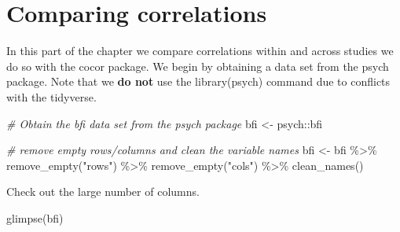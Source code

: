 \documentclass[
]{krantz}
\makeatletter
\newenvironment{Shaded}{\begin{snugshade}}{\end{snugshade}}
\newcommand{\CommentTok}[1]{\textcolor[rgb]{0.37,0.37,0.37}{\textit{#1}}}
\newcommand{\FunctionTok}[1]{\textcolor[rgb]{0,0,0}{#1}}
\newcommand{\NormalTok}[1]{#1}
\newcommand{\OtherTok}[1]{\textcolor[rgb]{0.37,0.37,0.37}{#1}}
\newcommand{\SpecialCharTok}[1]{\textcolor[rgb]{0,0,0}{#1}}
\newcommand{\StringTok}[1]{\textcolor[rgb]{0.5,0.5,0.5}{#1}}
\newenvironment{kframe}{%
\medskip{}
\setlength{\fboxsep}{.8em}
 \def\at@end@of@kframe{}%
 \ifinner\ifhmode%
  \def\at@end@of@kframe{\end{minipage}}%
  \begin{minipage}{\columnwidth}%
 \fi\fi%
 \def\FrameCommand##1{\hskip\@totalleftmargin \hskip-\fboxsep
 \colorbox{shadecolor}{##1}\hskip-\fboxsep
     \hskip-\linewidth \hskip-\@totalleftmargin \hskip\columnwidth}%
 \MakeFramed {\advance\hsize-\width
   \@totalleftmargin\z@ \linewidth\hsize
   \@setminipage}}%
 {\par\unskip\endMakeFramed%
 \at@end@of@kframe}
\renewenvironment{Shaded}{\begin{kframe}}{\end{kframe}}
\makeatother
\begin{document}
\hypertarget{comparing-correlations}{%
\section{Comparing correlations}\label{comparing-correlations}}

In this part of the chapter we compare correlations within and across studies we do so with the cocor package. We begin by obtaining a data set from the psych package. Note that we \textbf{do not} use the library(psych) command due to conflicts with the tidyverse.

\begin{Shaded}
\begin{Highlighting}[]
\CommentTok{\# Obtain the bfi data set from the psych package}
\NormalTok{bfi }\OtherTok{\textless{}{-}}\NormalTok{ psych}\SpecialCharTok{::}\NormalTok{bfi}

\CommentTok{\# remove empty rows/columns and clean the variable names}
\NormalTok{bfi }\OtherTok{\textless{}{-}}\NormalTok{ bfi }\SpecialCharTok{\%\textgreater{}\%}
  \FunctionTok{remove\_empty}\NormalTok{(}\StringTok{"rows"}\NormalTok{) }\SpecialCharTok{\%\textgreater{}\%}
  \FunctionTok{remove\_empty}\NormalTok{(}\StringTok{"cols"}\NormalTok{) }\SpecialCharTok{\%\textgreater{}\%}
  \FunctionTok{clean\_names}\NormalTok{()}
\end{Highlighting}
\end{Shaded}

Check out the large number of columns.

\begin{Shaded}
\begin{Highlighting}[]
\FunctionTok{glimpse}\NormalTok{(bfi)}
\end{Highlighting}
\end{Shaded}
\end{document}
